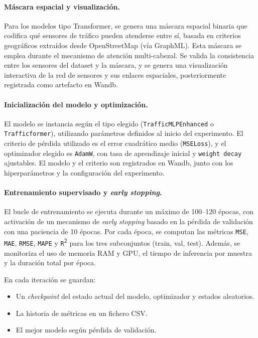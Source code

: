 \paragraph{Máscara espacial y visualización.}  
Para los modelos tipo Transformer, se genera una máscara espacial binaria que codifica qué sensores de tráfico pueden atenderse entre sí, basada en criterios geográficos extraídos desde OpenStreetMap (vía GraphML). Esta máscara se emplea durante el mecanismo de atención multi-cabezal. Se valida la consistencia entre los sensores del dataset y la máscara, y se genera una visualización interactiva de la red de sensores y sus enlaces espaciales, posteriormente registrada como artefacto en Wandb.

\paragraph{Inicialización del modelo y optimización.}  
El modelo se instancia según el tipo elegido (\texttt{TrafficMLPEnhanced} o \texttt{Trafficformer}), utilizando parámetros definidos al inicio del experimento. El criterio de pérdida utilizado es el error cuadrático medio (\texttt{MSELoss}), y el optimizador elegido es \texttt{AdamW}, con tasa de aprendizaje inicial y \texttt{weight decay} ajustables. El modelo y el criterio son registrados en Wandb, junto con los hiperparámetros y la configuración del experimento.

\paragraph{Entrenamiento supervisado y \textit{early stopping}.}  
El bucle de entrenamiento se ejecuta durante un máximo de 100--120 épocas, con activación de un mecanismo de \textit{early stopping} basado en la pérdida de validación con una paciencia de 10 épocas. Por cada época, se computan las métricas \texttt{MSE}, \texttt{MAE}, \texttt{RMSE}, \texttt{MAPE} y \texttt{R\textsuperscript{2}} para los tres subconjuntos (train, val, test). Además, se monitoriza el uso de memoria RAM y GPU, el tiempo de inferencia por muestra y la duración total por época.

En cada iteración se guardan:

\begin{itemize}
	\item Un \textit{checkpoint} del estado actual del modelo, optimizador y estados aleatorios.
	\item La historia de métricas en un fichero CSV.
	\item El mejor modelo según pérdida de validación.
\end{itemize}

